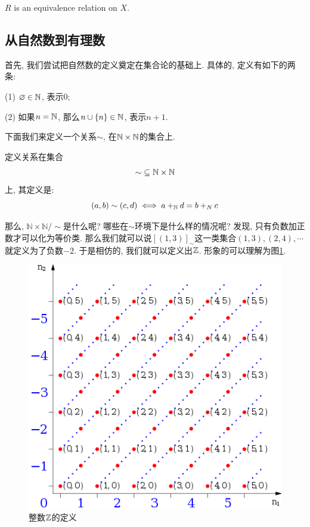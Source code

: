 \begin{theorem}
    $R$ is an equivalence relation on  $X$.
\end{theorem}

\subsection{从自然数到有理数}

首先, 我们尝试把自然数的定义奠定在集合论的基础上. 具体的, 定义有如下的两条: 

\begin{definition}[自然数的定义]
	(1) $\varnothing\in \mathbb{N} $, 表示0;
	
	(2) 如果$n=\mathbb{N} $, 那么$n\cup\{n\}\in \mathbb{N} $, 表示$n+1$. 
\end{definition} 

下面我们来定义一个关系$\sim$, 在$\mathbb{N} \times \mathbb{N} $的集合上.  
\begin{definition}
定义关系在集合
  \[
    \sim\; \subseteq \mathbb{N} \times \mathbb{N}
  \]
上, 其定义是: 
  \[
    (a, b) \sim (c, d) \iff a +_{\mathbb{N}} d = b +_{N} c
  \]
\end{definition}

那么, $\mathbb{N} \times \mathbb{N}/\sim$是什么呢? 哪些在$\sim$环境下是什么样的情况呢? 发现, 只有负数加正数才可以化为等价类. 那么我们就可以说$[(1,3)]_\sim$这一类集合$(1,3),(2,4),\cdots$就定义为了负数$-2$. 于是相仿的, 我们就可以定义出$\mathbb{Z}$. 形象的可以理解为图\ref{fig:zdef}.

\begin{figure}
	\centering
	\includegraphics[scale=0.5]{3-set-theory/figs/ndef}
	
	\caption{整数$\mathbb{Z}$的定义}
	\label{fig:zdef}
\end{figure}


